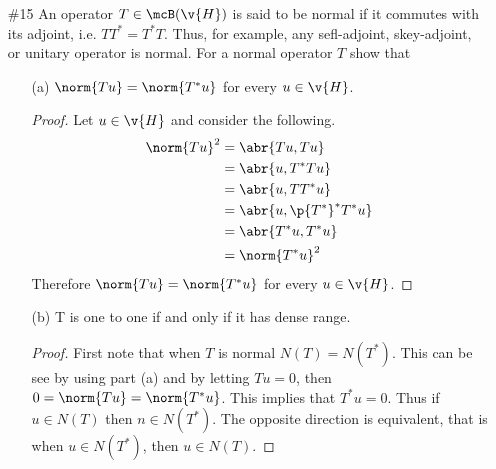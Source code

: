 \documentclass[11pt, oneside]{article}
\begin{document}
\begin{enumerate}
\begin{proof}
\begin{align*}
        &= 1- \lim[n \to \infty]{\frac{2}{\frac{1}{n} + 1}\p{1 - \p{\frac{1}{n}}^{\frac{1}{n} + 1}}} + \lim[n \to \infty]{\frac{1}{\frac{2}{n} + 1}\p{1 - \p{\frac{1}{n}}^{\frac{2}{n} + 1}}} \\
        &= 1 - 2 + 1 = 0
      \end{align*}
      Therefore $Mu_n \to 1$ in $L^2(0, 1)$.
      Lastly I will show that $1 \not\in R(M)$ in order to show that $R(M)$ is
      not closed.
    \end{proof}

  \pagebreak
  \item[\#15] %
    An operator $T \in \mcB(\v{H})$ is said to be normal if it commutes with
    its adjoint, i.e. $TT^* = T^*T$.
    Thus, for example, any sefl-adjoint, skey-adjoint, or unitary operator is
    normal.
    For a normal operator $T$ show that
    \begin{enumerate}
      \item[(a)] %
        $\norm{Tu} = \norm{T^*u}$ for every $u \in \v{H}$.

        \begin{proof}
          Let $u \in \v{H}$ and consider the following.
          \begin{align*}
            \norm{Tu}^2 &= \abr{Tu, Tu} \\
                        &= \abr{u, T^* T u} \\
                        &= \abr{u, T T^* u} \\
                        &= \abr{u, \p{T^*}^* T^* u} \\
                        &= \abr{T^*u, T^* u} \\
                        &= \norm{T^* u}^2
          \end{align*}
          Therefore $\norm{Tu} = \norm{T^* u}$ for every $u \in \v{H}$.
        \end{proof}

      \item[(b)] %
        T is one to one if and only if it has dense range.

        \begin{proof}
          First note that when $T$ is normal $N(T) = N(T^*)$.
          This can be see by using part (a) and by letting $Tu = 0$, then
          $0 = \norm{Tu} = \norm{T^*u}$.
          This implies that $T^* u = 0$.
          Thus if $u \in N(T)$ then $n \in N(T^*)$.
          The opposite direction is equivalent, that is when $u \in N(T^*)$,
          then $u \in N(T)$.


\end{proof}
\end{enumerate}
\end{enumerate}
\end{document}
